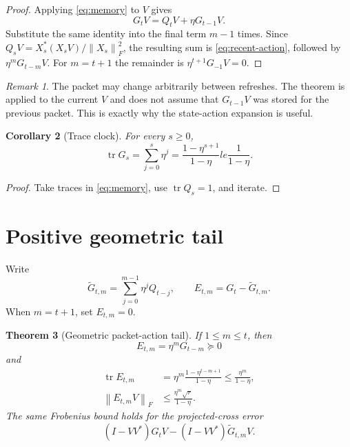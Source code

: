 \documentclass[11pt]{article}
\newtheorem{theorem}{Theorem}[section]
\newtheorem{corollary}[theorem]{Corollary}
\theoremstyle{definition}
\theoremstyle{remark}
\newtheorem{remark}[theorem]{Remark}
\newcommand{\norm}[1]{\left\lVert#1\right\rVert}
\newcommand{\tr}{\operatorname{tr}}
\begin{document}
\begin{proof}
Applying \eqref{eq:memory} to $V$ gives
\[
 G_tV=Q_tV+\eta G_{t-1}V.
\]
Substitute the same identity into the final term $m-1$ times.  Since
$Q_sV=X_s^*(X_sV)/\norm{X_s}_F^2$, the resulting sum is
\eqref{eq:recent-action}, followed by $\eta^mG_{t-m}V$.  For $m=t+1$ the
remainder is $\eta^{t+1}G_{-1}V=0$.
\end{proof}

\begin{remark}
The packet may change arbitrarily between refreshes.  The theorem is applied
to the current $V$ and does not assume that $G_{t-1}V$ was stored for the
previous packet.  This is exactly why the state-action expansion is useful.
\end{remark}

\begin{corollary}[Trace clock]
\label{cor:trace}
For every $s\ge0$,
\begin{equation}
 \tr G_s=\sum_{j=0}^{s}\eta^j
 =\frac{1-\eta^{s+1}}{1-\eta}le\frac1{1-\eta}.
 \label{eq:trace-clock}
\end{equation}
\end{corollary}

\begin{proof}
Take traces in \eqref{eq:memory}, use $\tr Q_s=1$, and iterate.
\end{proof}

\section{Positive geometric tail}
\label{sec:tail}

Write
\[
 \widetilde G_{t,m}=\sum_{j=0}^{m-1}\eta^jQ_{t-j},
 \qquad E_{t,m}=G_t-\widetilde G_{t,m}.
\]
When $m=t+1$, set $E_{t,m}=0$.

\begin{theorem}[Geometric packet-action tail]
\label{thm:tail}
If $1\le m\le t$, then
\begin{equation}
 E_{t,m}=\eta^mG_{t-m}\succeq0
 \label{eq:positive-tail}
\end{equation}
and
\begin{align}
 \tr E_{t,m}
 &=\eta^m\frac{1-\eta^{t-m+1}}{1-\eta}
 \le\frac{\eta^m}{1-\eta},
 \label{eq:trace-tail}\\
 \norm{E_{t,m}V}_F
 &\le\frac{\eta^m\sqrt r}{1-\eta}.
 \label{eq:action-tail}
\end{align}
The same Frobenius bound holds for the projected-cross error
\[
 (I-VV^*)G_tV-(I-VV^*)\widetilde G_{t,m}V.
\]
\end{theorem}
\end{document}
